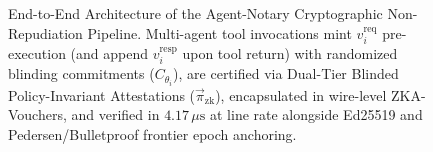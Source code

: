 \documentclass[conference,10pt]{IEEEtran}
\begin{document}
\begin{figure}[t]
{%
}
\caption{End-to-End Architecture of the Agent-Notary Cryptographic Non-Repudiation Pipeline. Multi-agent tool invocations mint $v_i^{\text{req}}$ pre-execution (and append $v_i^{\text{resp}}$ upon tool return) with randomized blinding commitments ($C_{\theta_i}$), are certified via Dual-Tier Blinded Policy-Invariant Attestations ($\vec{\pi}_{\text{zk}}$), encapsulated in wire-level ZKA-Vouchers, and verified in $4.17\,\mu\text{s}$ at line rate alongside Ed25519 and Pedersen/Bulletproof frontier epoch anchoring.}
\label{fig:notary_arch}
\end{figure}
\end{document}
